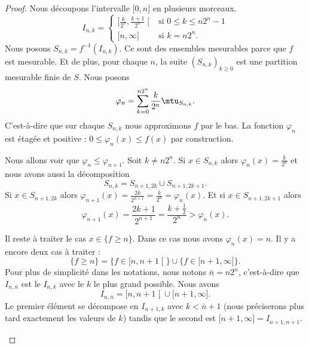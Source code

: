 \begin{proof}
	Nous découpons l'intervalle \( \mathopen[ 0 , n \mathclose]\) en plusieurs morceaux.
	\begin{equation}
		I_{n,k}=\begin{cases}
			\mathopen[ \frac{ k }{ 2^n } , \frac{ k+1 }{ 2^n } \mathclose[ & \text{si } 0\leq k\leq n2^n-1 \\
			\mathopen[ n , \infty \mathclose]                              & \text{si } k=n2^n.
		\end{cases}
	\end{equation}
	Nous posons \( S_{n,k}=f^{-1}(I_{n,k})\). Ce sont des ensembles mesurables parce que \( f\) est mesurable. Et de plus, pour chaque \( n\), la suite \( (S_{n,k})_{k\geq 0}\) est une partition mesurable finie de \( S\). Nous posons
	\begin{equation}
		\varphi_n=\sum_{k=0}^{n2^n}\frac{ k }{ 2^n }\mtu_{S_{n,k}}.
	\end{equation}
	C'est-à-dire que sur chaque \( S_{n,k}\) nous approximons \( f\) par le bas. La fonction \( \varphi_n\) est étagée et positive : \( 0\leq \varphi_n(x)\leq f(x)\) par construction.
	\begin{subproof}
		\spitem[Croissance]
		Nous allons voir que \( \varphi_n\leq \varphi_{n+1}\). Soit \( k\neq n2^n\). Si \( x\in S_{n,k}\) alors \( \varphi_n(x)=\frac{ k }{ 2^n }\) et nous avons aussi la décomposition
		\begin{equation}
			S_{n,k}=S_{n+1,2k}\cup S_{n+1,2k+1}.
		\end{equation}
		Si \( x\in S_{n+1,2k}\) alors \( \varphi_{n+1}(x)=\frac{ 2k }{ 2^{n+1} }=\frac{ k }{ 2^n }=\varphi_n(x)\). Et si \( x\in S_{n+1,2k+1}\) alors
		\begin{equation}
			\varphi_{n+1}(x)=\frac{ 2k+1 }{ 2^{n+1} }=\frac{ k+\frac{ 1 }{2} }{ 2^n }>\varphi_n(x).
		\end{equation}

		Il reste à traiter le cas \( x\in\{ f\geq n \}\). Dans ce cas nous avons \( \varphi_n(x)=n\). Il y a encore deux cas à traiter :
		\begin{equation}
			\{ f\geq n \}=\{ f\in\mathopen[ n , n+1 \mathclose[ \}\cup\{ f\in\mathopen[ n+1 , \infty \mathclose] \}.
		\end{equation}
		Pour plus de simplicité dans les notations, nous notons \( \bar n=n2^n\), c'est-à-dire que \( I_{n,\bar n}\) est le \( I_{n,k}\) avec le \( k\) le plus grand possible. Nous avons
		\begin{equation}
			I_{n,\bar n}=\mathopen[ n , n+1 \mathclose[\cup\mathopen[ n+1 , \infty \mathclose].
		\end{equation}
		Le premier élément se décompose en \( I_{n+1,k}\) avec \( k<\bar n+1\) (nous préciserons plus tard exactement les valeurs de \( k\)) tandis que le second est \( \mathopen[ n+1 , \infty \mathclose]=I_{n+1,\overline{ n+1 }}\).


\end{subproof}
\end{proof}
